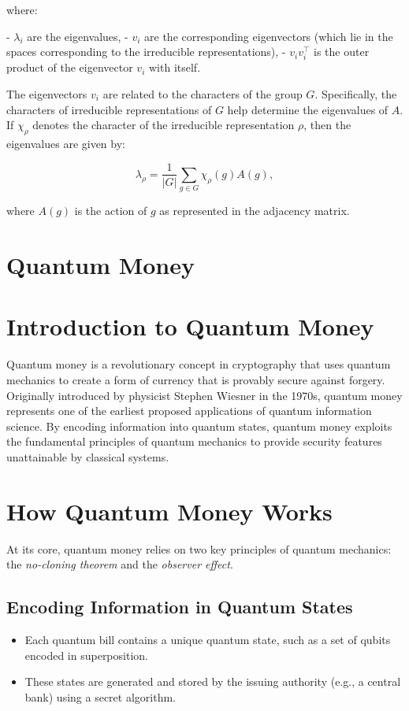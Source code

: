 \documentclass[11pt]{article}
\theoremstyle{definition}
\begin{document}
where:

- $\lambda_{i}$ are the eigenvalues,
- $v_{i}$ are the corresponding eigenvectors (which lie in the spaces corresponding to the irreducible representations),
- $v_{i} v_{i}^{\top}$ is the outer product of the eigenvector $v_{i}$ with itself.

The eigenvectors $v_{i}$ are related to the characters of the group $G$. Specifically, the characters of irreducible representations of $G$ help determine the eigenvalues of $A$. If $\chi_{\rho}$ denotes the character of the irreducible representation $\rho$, then the eigenvalues are given by:

\[
\lambda_{\rho} = \frac{1}{|G|} \sum_{g \in G} \chi_{\rho}(g) A(g),
\]

where $A(g)$ is the action of $g$ as represented in the adjacency matrix.






\section{Quantum Money}


\section*{Introduction to Quantum Money}
Quantum money is a revolutionary concept in cryptography that uses quantum mechanics to create a form of currency that is provably secure against forgery. Originally introduced by physicist Stephen Wiesner in the 1970s, quantum money represents one of the earliest proposed applications of quantum information science. By encoding information into quantum states, quantum money exploits the fundamental principles of quantum mechanics to provide security features unattainable by classical systems.

\section*{How Quantum Money Works}
At its core, quantum money relies on two key principles of quantum mechanics: the \textit{no-cloning theorem} and the \textit{observer effect}.

\subsection*{Encoding Information in Quantum States}
\begin{itemize}
    \item Each quantum bill contains a unique quantum state, such as a set of qubits encoded in superposition.
    \item These states are generated and stored by the issuing authority (e.g., a central bank) using a secret algorithm.
\end{itemize}
\end{document}
